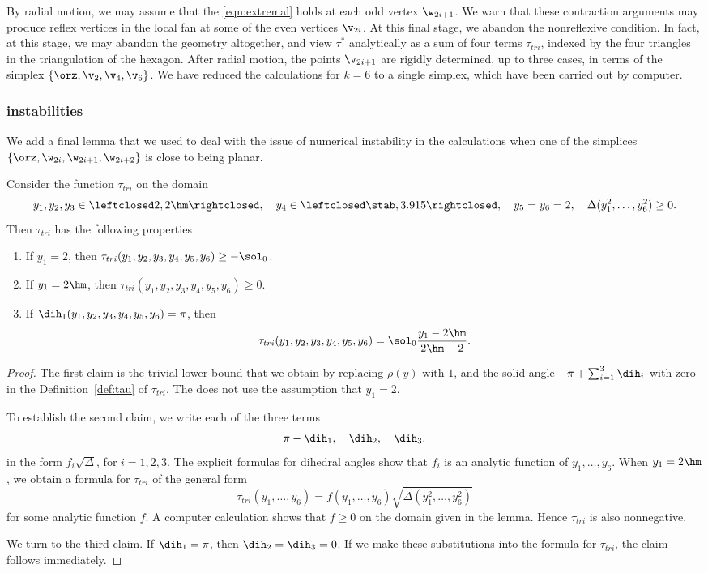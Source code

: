 By radial motion, we may assume that the \eqref{eqn:extremal} holds at
each odd vertex $\w_{2i+1}$.  We warn that these contraction arguments
may produce reflex vertices in the local fan at some of the even
vertices $\v_{2i}$.  At this final stage, we abandon the nonreflexive
condition.  In fact, at this stage, we may abandon the geometry
altogether, and view $\tau^*$ analytically as a sum of four terms
$\tau_{tri}$, indexed by the four triangles in the triangulation of
the hexagon.  After radial motion, the points $\v_{2i+1}$ are rigidly
determined, up to three cases, in terms of the simplex
$\{\orz,\v_2,\v_4,\v_6\}$.  We have reduced the calculations for $k=6$
to a single simplex, which have been carried out by computer.

\subsubsection{instabilities}

We add a final lemma that we used to deal with the issue of numerical
instability in the calculations when one of the simplices 
$\{\orz,\w_{2i},\w_{2i+1},\w_{2i+2}\}$ is close to being planar.

\begin{lemma}
Consider the function $\tau_{tri}$
on the domain
\[
y_1,y_2,y_3\in\leftclosed 2,2\hm\rightclosed,
\quad y_4\in\leftclosed \stab,3.915\rightclosed,
\quad y_5=y_6=2,\quad
\Delta(y_1^2,\ldots,y_6^2)\ge0.
\]
Then $\tau_{tri}$ has the following properties
\begin{enumerate}
\item If $y_1=2$, then $\tau_{tri}(y_1,y_2,y_3,y_4,y_5,y_6)\ge -\sol_0$.
\item If $y_1=2\hm$, then $\tau_{tri}(y_1,y_2,y_3,y_4,y_5,y_6)\ge 0$.
\item If $\dih_1(y_1,y_2,y_3,y_4,y_5,y_6) =\pi$, then 
  \[
  \tau_{tri}(y_1,y_2,y_3,y_4,y_5,y_6) = \sol_0\dfrac{y_1 -2\hm}{2\hm-2}.
  \]
\end{enumerate}
\end{lemma}

\begin{proof}
The first claim is the trivial lower bound that we obtain by replacing
$\rho(y)$
with $1$, and the solid angle $-\pi+\sum_{i=1}^3 \dih_i$ with zero
in the Definition~\ref{def:tau} of $\tau_{tri}$.  The does not use the
assumption that $y_1=2$.

To establish the second claim, we write each of the three terms 
\[
\pi-\dih_1,\quad\dih_2,\quad \dih_3.
\]
in the form $f_i\sqrt{\Delta}$, for $i=1,2,3$.  The explicit formulas
for dihedral angles show that $f_i$ is an analytic function of
$y_1,\ldots,y_6$.  When $y_1=2\hm$, we obtain a formula for
$\tau_{tri}$ of the general form
\[
\tau_{tri}(y_1,\ldots,y_6)= f(y_1,\ldots,y_6)\sqrt{\Delta(y_1^2,\ldots,y_6^2)}
\]
for some analytic function $f$.  A computer calculation shows that $f\ge0$
on the domain given in the lemma. Hence $\tau_{tri}$ is also nonnegative.

We turn to the third claim.  If $\dih_1=\pi$, then $\dih_2=\dih_3=0$.
If we make these substitutions into the formula for $\tau_{tri}$, the
claim follows immediately.
\end{proof}

